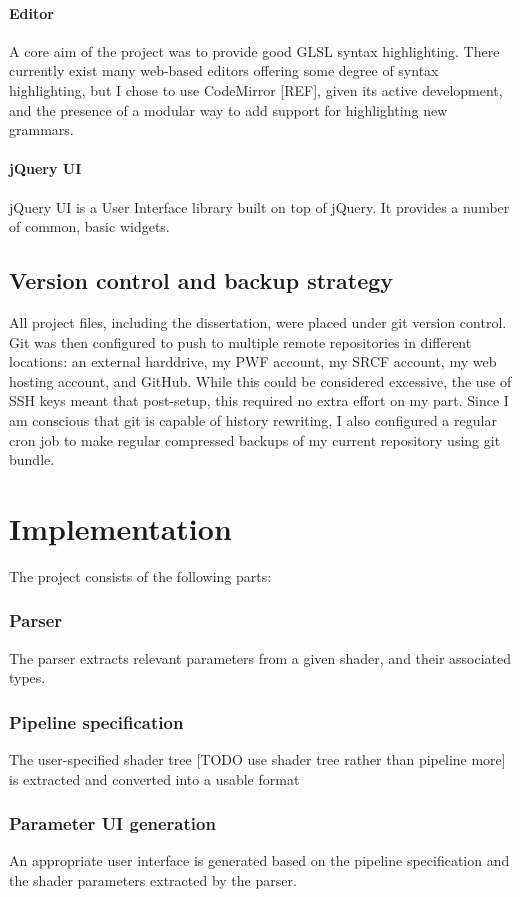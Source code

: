 \documentclass[12pt,twoside,notitlepage]{report}
\begin{document}
\subsubsection{Editor}
A core aim of the project was to provide good GLSL syntax highlighting. There currently exist many web-based editors offering some degree of syntax highlighting, but I chose to use CodeMirror [REF], given its active development, and the presence of a modular way to add support for highlighting new grammars. 

\subsubsection{jQuery UI}
jQuery UI is a User Interface library built on top of jQuery. It provides a number of common, basic widgets.

\section{Version control and backup strategy}
All project files, including the dissertation, were placed under git version control. Git was then configured to push to multiple remote repositories in different locations: an external harddrive, my PWF account, my SRCF account, my web hosting account, and GitHub. While this could be considered excessive, the use of SSH keys meant that post-setup, this required no extra effort on my part. Since I am conscious that git is capable of history rewriting, I also configured a regular cron job to make regular compressed backups of my current repository using git bundle.

\cleardoublepage
\chapter{Implementation}
The project consists of the following parts:
\subsection{Parser}
The parser extracts relevant parameters from a given shader, and their associated types.
\subsection{Pipeline specification}
The user-specified shader tree [TODO use shader tree rather than pipeline more] is extracted and converted into a usable format
\subsection{Parameter UI generation}
An appropriate user interface is generated based on the pipeline specification and the shader parameters extracted by the parser.
\end{document}
